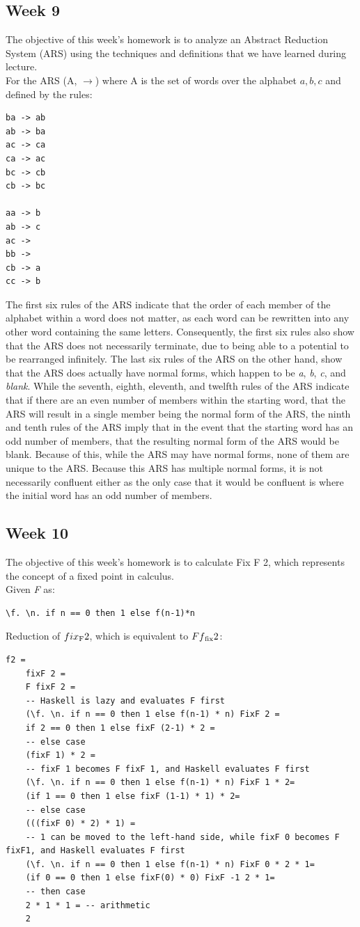 \documentclass{article}
\theoremstyle{theorem}
\theoremstyle{definition}
\theoremstyle{remark}
\begin{document}
\subsection{Week 9}
The objective of this week's homework is to analyze an Abstract Reduction System (ARS) using the techniques and definitions that we have learned during lecture. \\
For the ARS (A, $\xrightarrow{}$) where A is the set of words over the alphabet ${a, b, c}$ and defined by the rules:
\begin{lstlisting}
ba -> ab
ab -> ba
ac -> ca
ca -> ac
bc -> cb
cb -> bc

aa -> b
ab -> c
ac ->
bb ->
cb -> a
cc -> b
\end{lstlisting}
The first six rules of the ARS indicate that the order of each member of the alphabet within a word does not matter, as each word can be rewritten into any other word containing the same letters. Consequently, the first six rules also show that the ARS does not necessarily terminate, due to being able to a potential to be rearranged infinitely. The last six rules of the ARS on the other hand, show that the ARS does actually have normal forms, which happen to be \textit{a}, \textit{b}, \textit{c}, and \textit{blank}. While the seventh, eighth, eleventh, and twelfth rules of the ARS indicate that if there are an even number of members within the starting word, that the ARS will result in a single member being the normal form of the ARS, the ninth and tenth rules of the ARS imply that in the event that the starting word has an odd number of members, that the resulting normal form of the ARS would be blank. Because of this, while the ARS may have normal forms, none of them are unique to the ARS. Because this ARS has multiple normal forms, it is not necessarily confluent either as the only case that it would be confluent is where the initial word has an odd number of members.
\subsection{Week 10}
The objective of this week's homework is to calculate Fix F 2, which represents the concept of a fixed point in calculus. \\
Given \textit{F} as:
\begin{lstlisting}
\f. \n. if n == 0 then 1 else f(n-1)*n
\end{lstlisting}
Reduction of $fix\textsubscript{F}2$, which is equivalent to $Ff\textsubscript{fix}2$:
\begin{lstlisting}
f2 =
    fixF 2 =
    F fixF 2 =
    -- Haskell is lazy and evaluates F first
    (\f. \n. if n == 0 then 1 else f(n-1) * n) FixF 2 =
    if 2 == 0 then 1 else fixF (2-1) * 2 =
    -- else case
    (fixF 1) * 2 =
    -- fixF 1 becomes F fixF 1, and Haskell evaluates F first
    (\f. \n. if n == 0 then 1 else f(n-1) * n) FixF 1 * 2=
    (if 1 == 0 then 1 else fixF (1-1) * 1) * 2=
    -- else case
    (((fixF 0) * 2) * 1) =
    -- 1 can be moved to the left-hand side, while fixF 0 becomes F fixF1, and Haskell evaluates F first
    (\f. \n. if n == 0 then 1 else f(n-1) * n) FixF 0 * 2 * 1=
    (if 0 == 0 then 1 else fixF(0) * 0) FixF -1 2 * 1=
    -- then case
    2 * 1 * 1 = -- arithmetic
    2
\end{lstlisting}
\end{document}

